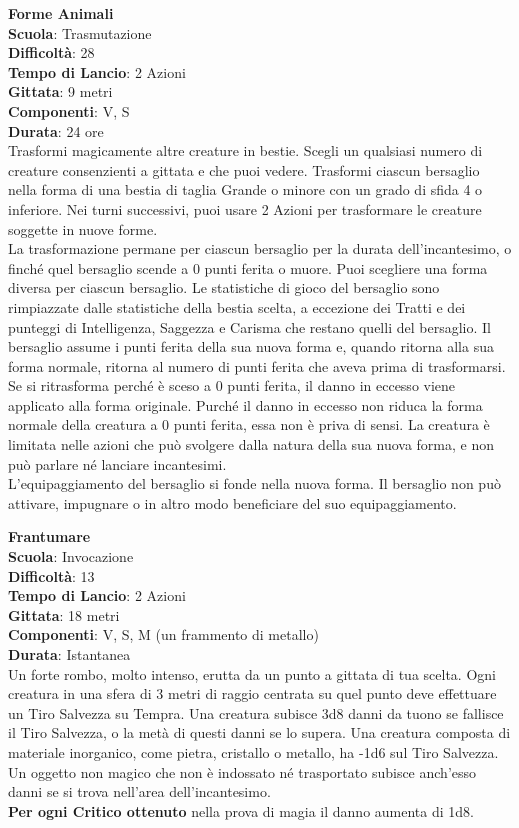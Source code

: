 \begin{multicols}{2}
\medskip\textbf{Forme Animali}\\
\textbf{Scuola}: Trasmutazione\\
\textbf{Difficoltà}: 28\\
\textbf{Tempo di Lancio}: 2 Azioni\\
\textbf{Gittata}: 9 metri\\
\textbf{Componenti}: V, S\\
\textbf{Durata}: 24 ore\\
Trasformi magicamente altre creature in bestie. Scegli un qualsiasi numero di creature consenzienti a gittata e che puoi vedere. Trasformi ciascun bersaglio nella forma di una bestia di taglia Grande o minore con un grado di sfida 4 o inferiore. Nei turni successivi, puoi usare 2 Azioni per trasformare le creature soggette in nuove forme.\\
La trasformazione permane per ciascun bersaglio per la durata dell'incantesimo, o finché quel bersaglio scende a 0 punti ferita o muore. Puoi scegliere una forma diversa per ciascun bersaglio. Le statistiche di gioco del bersaglio sono rimpiazzate dalle statistiche della bestia scelta, a eccezione dei Tratti e dei punteggi di Intelligenza, Saggezza e Carisma che restano quelli del
bersaglio. Il bersaglio assume i punti ferita della sua nuova forma e, quando ritorna alla sua forma normale, ritorna al numero di punti ferita che aveva prima di trasformarsi. Se si ritrasforma perché è sceso a 0 punti ferita, il danno in eccesso viene applicato alla forma originale. Purché il danno in eccesso non riduca la forma normale della creatura a 0 punti ferita, essa non è priva di sensi. La creatura è limitata nelle azioni che può svolgere dalla natura della sua nuova forma, e non può parlare né lanciare incantesimi.\\
L'equipaggiamento del bersaglio si fonde nella nuova forma. Il bersaglio non può attivare, impugnare o in altro modo beneficiare del suo equipaggiamento.

\medskip\textbf{Frantumare}\\
\textbf{Scuola}: Invocazione\\
\textbf{Difficoltà}: 13\\
\textbf{Tempo di Lancio}: 2 Azioni\\
\textbf{Gittata}: 18 metri\\
\textbf{Componenti}: V, S, M (un frammento di metallo)\\
\textbf{Durata}: Istantanea\\
Un forte rombo, molto intenso, erutta da un punto a gittata di tua scelta. Ogni creatura in una sfera di 3 metri di raggio centrata su quel punto deve effettuare un Tiro Salvezza su Tempra. Una creatura subisce 3d8 danni da tuono se fallisce il Tiro Salvezza, o la metà di questi danni se lo supera. Una creatura composta di materiale inorganico, come pietra, cristallo o metallo, ha -1d6 sul Tiro Salvezza. Un oggetto non magico che non è indossato né trasportato subisce anch'esso danni se si trova nell'area dell'incantesimo.\\
\textbf{Per ogni Critico ottenuto} nella prova di magia il danno aumenta di 1d8.


\end{multicols}
